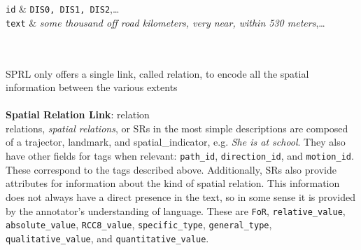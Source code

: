 \documentclass{article}
\begin{document}
\begin{attributes}
{\tt id} 			&	\texttt{DIS0, DIS1, DIS2},\ldots\\
\hline
{\tt text}	&	\emph{some thousand off road kilometers, very near, within 530 meters},\ldots \\
\end{attributes}
\\
\\
SPRL only offers a single link, called {\sc relation}, to encode all the spatial information between the various extents  
\\
\\
{\bf Spatial Relation Link}: {\sc relation}
\\
{\sc relation}s, \emph{spatial relations}, or SRs in the most simple descriptions are composed of a {\sc trajector}, {\sc landmark}, and {\sc spatial\_indicator}, e.g. \emph{She is at school}.  They also have other fields for tags when relevant: {\tt path\_id}, {\tt direction\_id},  and {\tt motion\_id}.  These correspond to the tags described above.  Additionally, SRs also provide attributes for information about the kind of spatial relation.  This information does not always have a direct presence in the text, so in some sense it is provided by the annotator's understanding of language.  These are {\tt FoR}, {\tt relative\_value}, {\tt absolute\_value}, {\tt RCC8\_value}, {\tt specific\_type}, {\tt general\_type}, {\tt qualitative\_value}, and {\tt quantitative\_value}.  
\end{document}
